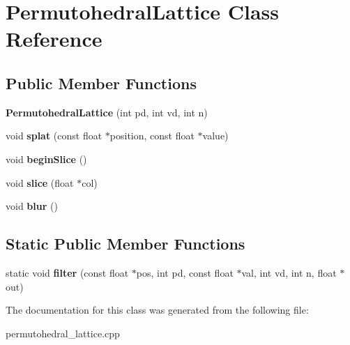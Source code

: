 \hypertarget{classPermutohedralLattice}{}\section{Permutohedral\+Lattice Class Reference}
\label{classPermutohedralLattice}
\subsection*{Public Member Functions}
\begin{DoxyCompactItemize}
\item 
{\bfseries Permutohedral\+Lattice} (int pd, int vd, int n)\hypertarget{classPermutohedralLattice_a4d5de5acf49dd95a3e418fd3a8e90bbe}{}\label{classPermutohedralLattice_a4d5de5acf49dd95a3e418fd3a8e90bbe}

\item 
void {\bfseries splat} (const float $\ast$position, const float $\ast$value)\hypertarget{classPermutohedralLattice_a58fa5f5023232923df3753797c1b89f1}{}\label{classPermutohedralLattice_a58fa5f5023232923df3753797c1b89f1}

\item 
void {\bfseries begin\+Slice} ()\hypertarget{classPermutohedralLattice_a68eba6292f3982c46897bae3f7d2b474}{}\label{classPermutohedralLattice_a68eba6292f3982c46897bae3f7d2b474}

\item 
void {\bfseries slice} (float $\ast$col)\hypertarget{classPermutohedralLattice_a07d5d370f5162598705af5ee20a36a79}{}\label{classPermutohedralLattice_a07d5d370f5162598705af5ee20a36a79}

\item 
void {\bfseries blur} ()\hypertarget{classPermutohedralLattice_afc4a193493964071c3dd06d9fb05f8aa}{}\label{classPermutohedralLattice_afc4a193493964071c3dd06d9fb05f8aa}

\end{DoxyCompactItemize}
\subsection*{Static Public Member Functions}
\begin{DoxyCompactItemize}
\item 
static void {\bfseries filter} (const float $\ast$pos, int pd, const float $\ast$val, int vd, int n, float $\ast$out)\hypertarget{classPermutohedralLattice_a2bca7370b83f4859faf535138071f5aa}{}\label{classPermutohedralLattice_a2bca7370b83f4859faf535138071f5aa}

\end{DoxyCompactItemize}


The documentation for this class was generated from the following file\+:\begin{DoxyCompactItemize}
\item 
permutohedral\+\_\+lattice.\+cpp\end{DoxyCompactItemize}
